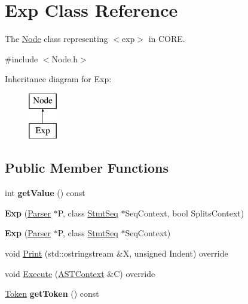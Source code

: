 \hypertarget{class_exp}{}\section{Exp Class Reference}
\label{class_exp}


The \mbox{\hyperlink{class_node}{Node}} class representing {\ttfamily $<$exp$>$} in C\+O\+RE.  




{\ttfamily \#include $<$Node.\+h$>$}

Inheritance diagram for Exp\+:\begin{figure}[H]
\begin{center}
\leavevmode
\includegraphics[height=2.000000cm]{class_exp}
\end{center}
\end{figure}
\subsection*{Public Member Functions}
\begin{DoxyCompactItemize}
\item 
\mbox{\label{class_exp_a40455fa62d359a4c7c165bd23590c8f6}} 
int {\bfseries get\+Value} () const
\item 
\mbox{\label{class_exp_ab245e9c5ed4d8e299f6a4d3c66ff5bd9}} 
{\bfseries Exp} (\mbox{\hyperlink{class_parser}{Parser}} $\ast$P, class \mbox{\hyperlink{class_stmt_seq}{Stmt\+Seq}} $\ast$Seq\+Context, bool Splits\+Context)
\item 
\mbox{\label{class_exp_a62124ce532ac3be34ee2a6f10dda35f0}} 
{\bfseries Exp} (\mbox{\hyperlink{class_parser}{Parser}} $\ast$P, class \mbox{\hyperlink{class_stmt_seq}{Stmt\+Seq}} $\ast$Seq\+Context)
\item 
void \mbox{\hyperlink{class_exp_a1f5a3ad89d1aa43c746768d813582f39}{Print}} (std\+::ostringstream \&X, unsigned Indent) override
\item 
void \mbox{\hyperlink{class_exp_adceca06dcf880f8ad1008774f0bda91d}{Execute}} (\mbox{\hyperlink{class_a_s_t_context}{A\+S\+T\+Context}} \&C) override
\item 
\mbox{\label{class_exp_a1daf5b30acd2e6d22aaa1f7ddc64ba37}} 
\mbox{\hyperlink{class_token}{Token}} {\bfseries get\+Token} () const
\end{DoxyCompactItemize}
